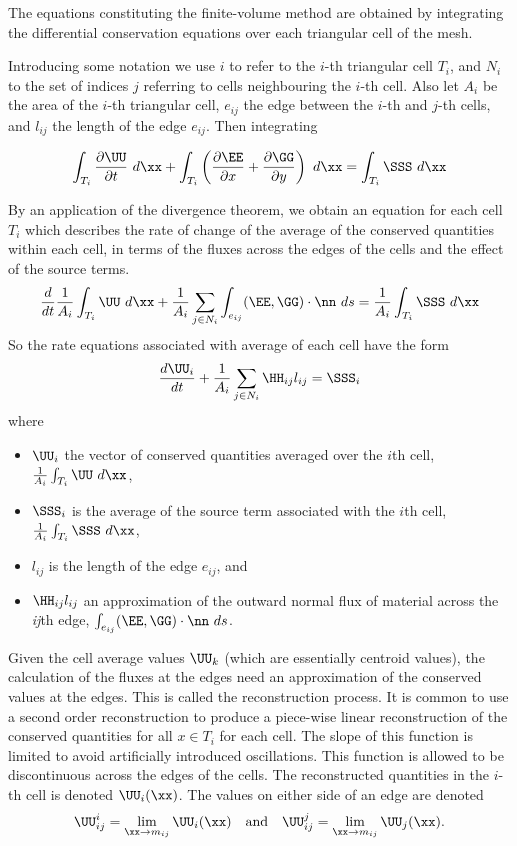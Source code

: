 \documentclass{manual}
\begin{document}
The equations constituting the finite-volume method are obtained by
integrating the differential conservation equations over each
triangular cell of the mesh.

Introducing some notation we use $i$ to
refer to the $i$-th triangular cell $T_i$, and $N_i$ to the
set of indices $j$ referring to cells neighbouring the $i$-th cell.
Also let $A_i$ be the area of the $i$-th triangular cell, $e_{ij}$ the edge between the
 $i$-th and $j$-th  cells, and $l_{ij}$
the length of the edge $e_{ij}$. Then integrating

\[
\int_{T_i} \frac{\partial \UU}{\partial t} \ d\xx + \int_{T_i} \left( \frac{\partial \EE}{\partial
x}+\frac{\partial \GG}{\partial y} \right)  \ d\xx =  \int_{T_i} \SSS   \ d\xx
\]

By an application of the divergence theorem, we obtain an equation for each cell $T_i$
which describes the rate of change of the average of the
conserved quantities within each cell, in terms of the fluxes across
the edges of the cells and the effect of the source terms.
\[
 \frac{d }{d t} \frac1{A_i} \int_{T_i}  \UU \ d\xx +  \frac1{A_i}  \sum_{j \in N_i} \int_{e_{ij}}  (\EE,  \GG) \cdot \nn  \ ds =  \frac1{A_i} \int_{T_i} \SSS   \ d\xx
\]
So the rate equations associated with average of each cell have the form
\[
 \frac{d\UU_i }{dt}+ \frac1{A_i}\sum\limits_{j\in N_i} \HH_{ij} l_{ij} = \SSS_i
\]
where
\begin{itemize}
  \item $\UU_i$ the vector of conserved quantities averaged over the $i$th cell, $\frac1{A_i} \int_{T_i}  \UU \ d\xx $,
  \item $\SSS_i$ is the average of the source term associated with the $i$th cell, $\frac1{A_i} \int_{T_i} \SSS   \ d\xx$,
   \item $l_{ij}$ is the length of the edge $e_{ij}$, and
  \item $\HH_{ij} l_{ij}$ an approximation of the outward normal flux of material across the \textit{ij}th edge, $\int_{e_{ij}}  (\EE,  \GG) \cdot \nn  \ ds$.
\end{itemize}

Given the cell average values $\UU_k$ (which are essentially centroid values), the calculation of the fluxes at the edges need an approximation of the conserved values at the edges. This is called the reconstruction process. It is common to use a second order reconstruction to produce a piece-wise linear
reconstruction of the conserved quantities for  all $x \in
T_i$ for each cell.  The slope of this function is limited to avoid
artificially introduced oscillations.
This
function is allowed to be discontinuous across the edges of the
cells. The reconstructed quantities in the $i$-th cell is denoted $\UU_i(\xx)$.
The values on either side of an edge are denoted
\[
\UU^i_{ij}  = \lim_{\xx \rightarrow m_{ij}}  \UU_i(\xx) \quad\text{and}\quad
\UU^j_{ij}  = \lim_{\xx \rightarrow m_{ij}}  \UU_j(\xx) .
\]
\end{document}
